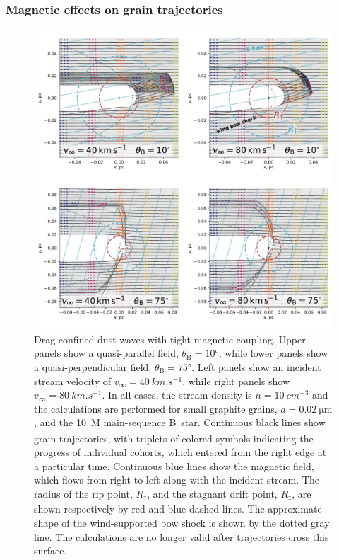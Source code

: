 \message{ !name(dusty-bow-wave.tex)}\documentclass[useAMS, usenatbib, a4paper]{mnras}
\newcommand{\B}{\ensuremath{_{\scriptscriptstyle\text{B}}}}
\begin{document}
\subsubsection{Magnetic effects on grain trajectories }
\label{sec:magn-effects-grain}

\begin{figure}
  \centering
  \includegraphics[width=\linewidth]{figs/frozen-stream-map-multi}
  \caption{Drag-confined dust waves with tight magnetic coupling.
    Upper panels show a quasi-parallel field, \(\theta\B = \ang{10}\),
    while lower panels show a quasi-perpendicular field,
    \(\theta\B = \ang{75}\).  Left panels show an incident stream velocity of
    \(v_\infty = \SI{40}{km.s^{-1}}\), while right panels show
    \(v_\infty = \SI{80}{km.s^{-1}}\).  In all cases, the stream density is
    \(n = \SI{10}{cm^{-3}}\) and the calculations are performed for
    small graphite grains, \(a = \SI{0.02}{\um}\), and the
    \SI{10}{M_\odot} main-sequence B~star.  Continuous black lines show
    grain trajectories, with triplets of colored symbols indicating
    the progress of individual cohorts, which entered from the right
    edge at a particular time.  Continuous blue lines show the
    magnetic field, which flows from right to left along with the
    incident stream.  The radius of the rip point, \(R_\dag\), and the
    stagnant drift point, \(R_\ddag\), are shown respectively by red and
    blue dashed lines.  The approximate shape of the wind-supported
    bow shock is shown by the dotted gray line.  The calculations are
    no longer valid after trajectories cross this surface.}
  \label{fig:frozen-stream}
\end{figure}
\end{document}
